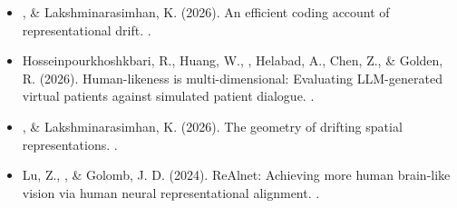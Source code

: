 \begin{itemize}
  \item {}, \& Lakshminarasimhan, K. (2026). An efficient coding account of representational drift. . 
  \item Hosseinpourkhoshkbari, R., Huang, W., , Helabad, A., Chen, Z., \& Golden, R. (2026). Human-likeness is multi-dimensional: Evaluating LLM-generated virtual patients against simulated patient dialogue. . 
  \item {}, \& Lakshminarasimhan, K. (2026). The geometry of drifting spatial representations. . 
  \item Lu, Z., , \& Golomb, J. D. (2024). ReAlnet: Achieving more human brain-like vision via human neural representational alignment. . 
\end{itemize}
